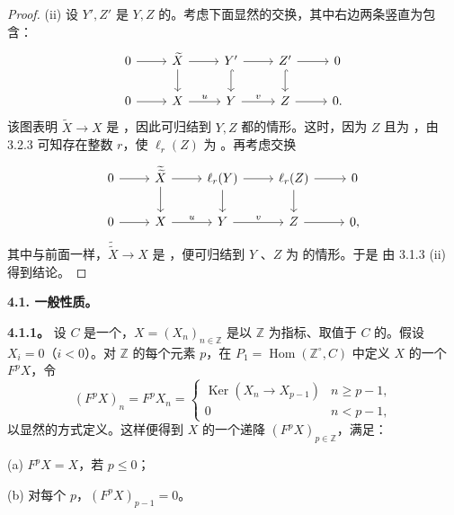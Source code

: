 \begin{proof}
(ii) 设 $Y',Z'$ 是 $Y,Z$ 的。考虑下面显然的交换，其中右边两条竖直为包含：
\[
\begin{tikzcd}0\arrow[r]&\widetilde X\arrow[r]\arrow[d]&Y'\arrow[r]\arrow[d,hook]&Z'\arrow[r]\arrow[d,hook]&0\\0\arrow[r]&X\arrow[r,"u"]&Y\arrow[r,"v"]&Z\arrow[r]&0.\end{tikzcd}
\]
该图表明 $\widetilde X\to X$ 是 ，因此可归结到 $Y,Z$ 都的情形。这时，因为 $Z$ 且为 ，由 3.2.3 可知存在整数 $r$，使 $\ell_r(Z)$ 为 。再考虑交换
\[
\begin{tikzcd}0\arrow[r]&\widetilde{\widetilde X}\arrow[r]\arrow[d]&\ell_r(Y)\arrow[r]\arrow[d]&\ell_r(Z)\arrow[r]\arrow[d]&0\\0\arrow[r]&X\arrow[r,"u"]&Y\arrow[r,"v"]&Z\arrow[r]&0,\end{tikzcd}
\]
其中与前面一样，$\widetilde{\widetilde X}\to X$ 是 ，便可归结到 $Y$ 、$Z$ 为 的情形。于是
由 3.1.3 (ii) 得到结论。
\end{proof}
\textbf{4.1. 一般性质。}

\textbf{4.1.1。} 设 $C$ 是一个，$X=(X_n)_{n\in\mathbb Z}$ 是以 $\mathbb Z$ 为指标、取值于 $C$ 的。假设 $X_i=0$（$i<0$）。对 $\mathbb Z$ 的每个元素 $p$，在 $P_1=\operatorname{Hom}(\mathbb Z^\circ,C)$ 中定义 $X$ 的一个 $F^pX$，令
\[
(F^pX)_n=F^pX_n=
\begin{cases}\operatorname{Ker}(X_n\longrightarrow X_{p-1})&n\geq p-1,\\0&n<p-1,\end{cases}
\]
以显然的方式定义。这样便得到 $X$ 的一个递降 $(F^pX)_{p\in\mathbb Z}$，满足：

(a) $F^pX=X$，若 $p\leq0$；

(b) 对每个 $p$，$(F^pX)_{p-1}=0$。

